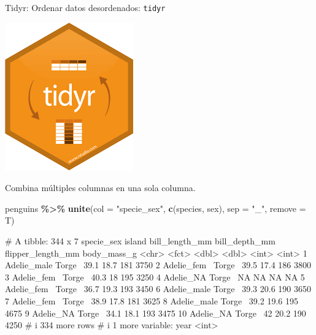 \documentclass[
  ignorenonframetext,
  aspectratio=169]{beamer}
\newenvironment{Shaded}{\begin{snugshade}}{\end{snugshade}}
\newcommand{\AttributeTok}[1]{\textcolor[rgb]{0.13,0.29,0.53}{#1}}
\newcommand{\FunctionTok}[1]{\textcolor[rgb]{0.13,0.29,0.53}{\textbf{#1}}}
\newcommand{\NormalTok}[1]{#1}
\newcommand{\SpecialCharTok}[1]{\textcolor[rgb]{0.81,0.36,0.00}{\textbf{#1}}}
\newcommand{\StringTok}[1]{\textcolor[rgb]{0.31,0.60,0.02}{#1}}
\let\oldverbatim\verbatim
\let\endoldverbatim\endverbatim
\renewenvironment{verbatim}{\tiny\oldverbatim}{\endoldverbatim}
\begin{document}
\begin{frame}[fragile]{Tidyr: Ordenar datos desordenados:
\texttt{tidyr}}
\label{tidyr-ordenar-datos-desordenados-tidyr-10}
\begin{flushright}\includegraphics[width=0.05\linewidth]{Imgs/logo_tidyr} \end{flushright}

Combina múltiples columnas en una sola columna.

\begin{Shaded}
\begin{Highlighting}[]
\NormalTok{penguins }\SpecialCharTok{\%\textgreater{}\%} \FunctionTok{unite}\NormalTok{(}\AttributeTok{col =} \StringTok{"specie\_sex"}\NormalTok{,}
                   \FunctionTok{c}\NormalTok{(species, sex), }\AttributeTok{sep =} \StringTok{"\_"}\NormalTok{, }\AttributeTok{remove =}\NormalTok{ T)}
\end{Highlighting}
\end{Shaded}

\begin{verbatim}
# A tibble: 344 x 7
   specie_sex  island bill_length_mm bill_depth_mm flipper_length_mm body_mass_g
   <chr>       <fct>           <dbl>         <dbl>             <int>       <int>
 1 Adelie_male Torge~           39.1          18.7               181        3750
 2 Adelie_fem~ Torge~           39.5          17.4               186        3800
 3 Adelie_fem~ Torge~           40.3          18                 195        3250
 4 Adelie_NA   Torge~           NA            NA                  NA          NA
 5 Adelie_fem~ Torge~           36.7          19.3               193        3450
 6 Adelie_male Torge~           39.3          20.6               190        3650
 7 Adelie_fem~ Torge~           38.9          17.8               181        3625
 8 Adelie_male Torge~           39.2          19.6               195        4675
 9 Adelie_NA   Torge~           34.1          18.1               193        3475
10 Adelie_NA   Torge~           42            20.2               190        4250
# i 334 more rows
# i 1 more variable: year <int>
\end{verbatim}
\end{frame}
\end{document}
